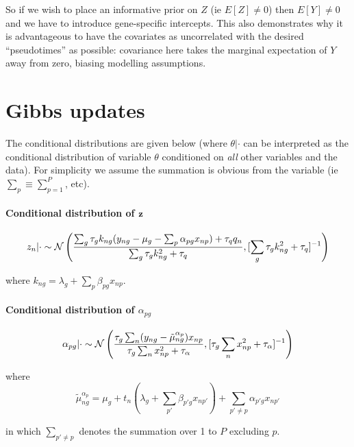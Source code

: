 So if we wish to place an informative prior on $Z$ (ie $E[Z] \neq 0$) then $E[Y] \neq 0$ and we have to introduce gene-specific intercepts. This also demonstrates why it is advantageous to have the covariates as uncorrelated with the desired ``pseudotimes'' as possible: covariance here takes the marginal expectation of $Y$ away from zero, biasing modelling assumptions.


\section{Gibbs updates} \label{app:clvm_gibbs}


The conditional distributions are given below (where $\theta | \cdot$ can be interpreted as the conditional distribution of variable $\theta$ conditioned on \emph{all} other variables and the data). For simplicity we assume the summation is obvious from the variable (ie $\sum_p \equiv \sum_{p=1}^P$, etc).



\paragraph{Conditional distribution of ${\bf z}$}
\begin{equation}
z_n | \cdot \sim \mathcal{N} \left( \frac{ \sum_g \tau_g k_{ng} (y_{ng} - \mu_{g} - \sum_p \alpha_{pg}x_{np}) + \tau_q q_n}{\sum_g \tau_g k_{ng}^2 + \tau_q}, [\sum_g \tau_g k_{ng}^2 + \tau_q]^{-1} \right)
\end{equation}

where $k_{ng} = \lambda_g + \sum_p \beta_{pg} x_{np}$.

\paragraph{Conditional distribution of $\alpha_{pg}$}
\begin{equation}
\alpha_{pg} | \cdot \sim \mathcal{N} \left( \frac{
\tau_g \sum_n (y_{ng} - \tilde{\mu}_{ng}^{\alpha_p})x_{np}
}{\tau_g \sum_n x_{np}^2 + \tau_\alpha},
[\tau_g \sum_n x_{np}^2 + \tau_\alpha]^{-1} \right)
\end{equation}

where
\begin{equation}
\tilde{\mu}_{ng}^{\alpha_p} = \mu_g + t_n(\lambda_g + \sum_{p'} \beta_{p'g} x_{np'}) + \sum_{p' \neq p} \alpha_{p'g} x_{np'}
\end{equation}

in which $\sum_{p' \neq p}$ denotes the summation over 1 to $P$ excluding $p$.

